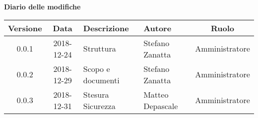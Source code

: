 	\begin{center}
		\textbf{Diario delle modifiche}
	\end{center}
	\begin{center}
		\begin{tabularx}{\textwidth}{|c|c|X|X|c|}
			\hline
			\textbf{Versione} & \textbf{Data} & \textbf{Descrizione} & \textbf{Autore} & \textbf{Ruolo} \\
			\hline
			0.0.1 & 2018-12-24 & Struttura & Stefano Zanatta & Amministratore\\
			0.0.2 & 2018-12-29 & Scopo e documenti & Stefano Zanatta & Amministratore\\
			0.0.3 & 2018-12-31 & Stesura Sicurezza & Matteo Depascale & Amministratore\\
			\hline
		\end{tabularx}
	\end{center}
\newpage